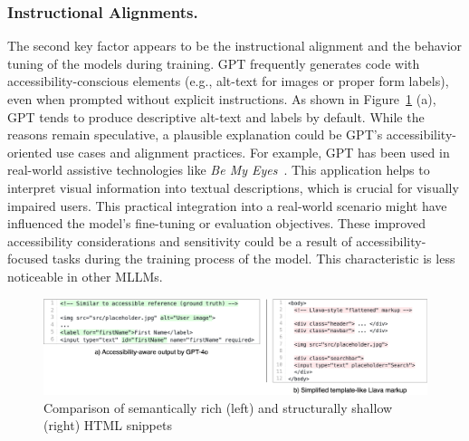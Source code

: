 \subsubsection{Instructional Alignments.} The second key 
factor appears to be the instructional alignment
and the behavior tuning of the models during training. GPT 
frequently generates code with accessibility-conscious elements
(e.g., alt-text for images or proper form labels), even when 
prompted without explicit instructions. As shown in 
Figure~\ref{fig:generalcapabilities} (a), GPT tends to produce 
descriptive alt-text and labels by default.\newline
While the reasons remain speculative, a plausible explanation 
could be GPT's accessibility-oriented use cases and 
alignment practices. For example, GPT has been used 
in real-world assistive technologies like \textit{Be My Eyes}~\cite{web:bemyeyes}. 
This application helps to interpret visual information into 
textual descriptions, which is crucial for visually impaired users.
This practical integration into a real-world scenario might 
have influenced the model's fine-tuning or evaluation objectives.
These improved accessibility considerations and sensitivity could 
be a result of accessibility-focused tasks during the training 
process of the model. This characteristic is less noticeable in 
other MLLMs.

\begin{figure}
  \centering
  \includegraphics[width=1\linewidth]{figures/generalcapability.png}
  \caption{Comparison of semantically rich (left) and structurally shallow (right) HTML snippets}
  \label{fig:generalcapabilities} 
\end{figure}

